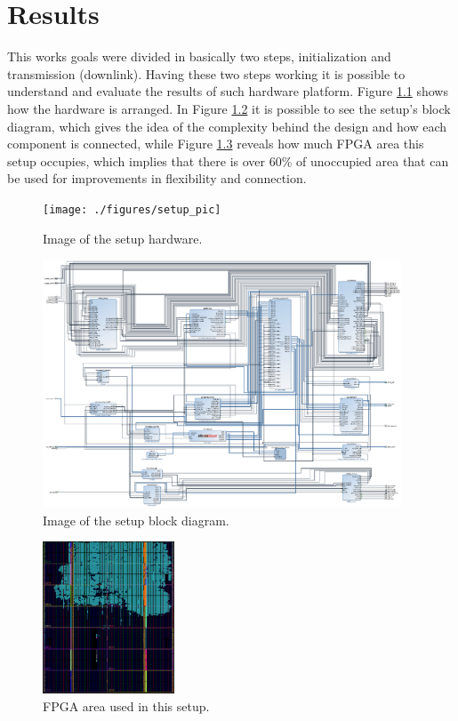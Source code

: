 \chapter{Results}
\label{chap:results}

This works goals were divided in basically two steps, initialization and
transmission (downlink). Having these two steps working it is possible to
understand and evaluate the results of such hardware platform. Figure
\ref{fig:setup} shows how the hardware is arranged. In Figure \ref{fig:setupbd}
it is possible to see the setup's block diagram, which gives the idea of the
complexity behind the design and how each component is connected, while Figure
\ref{fig:fpgaarea} reveals how much FPGA area this setup occupies, which implies
that there is over 60\% of unoccupied area that can be used for improvements in
flexibility and connection.

\begin{figure}[htbp]
    \centering
    \texttt{[image: ./figures/setup\_pic]}
    \caption{ Image of the setup hardware.
    \label{fig:setup}}
\end{figure}

\begin{figure}[htbp]
    \centering
    \includegraphics[width=0.95\textwidth]{./figures/setup_bd}
    \caption{ Image of the setup block diagram.
    \label{fig:setupbd}}
\end{figure}


\begin{figure}[htbp]
    \centering
    \includegraphics[width=0.35\textwidth]{./figures/fpga_area}
    \caption{ FPGA area used in this setup.
    \label{fig:fpgaarea}}
\end{figure}

